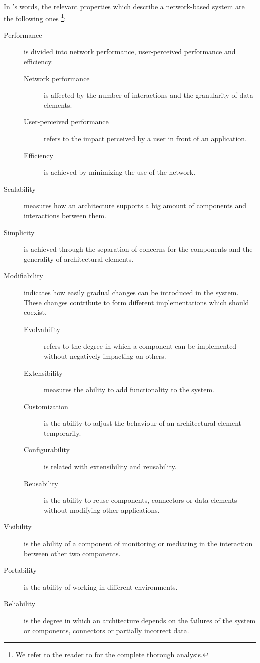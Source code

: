 In \citeauthor{fielding_architectural_2000}'s words, the relevant properties which describe a network-based system are the following ones \footnote{We refer to the reader to \citet{fielding_architectural_2000} for the complete thorough analysis.}:
\begin{description}
  \item[Performance] is divided into network performance, user-perceived performance and efficiency.
    \begin{description}
      \item[Network performance] is affected by the number of interactions and the granularity of data elements.
      \item[User-perceived performance] refers to the impact perceived by a user in front of an application. %
      \item[Efficiency] is achieved by minimizing the use of the network.
    \end{description}
  \item[Scalability] measures how an architecture supports a big amount of components and interactions between them.
  \item[Simplicity] is achieved through the separation of concerns for the components and the generality of architectural elements.
  \item[Modifiability] indicates how easily gradual changes can be introduced in the system.
                       These changes contribute to form different implementations which should coexist.
    \begin{description}
      \item[Evolvability] refers to the degree in which a component can be implemented without negatively impacting on others.
      \item[Extensibility] measures the ability to add functionality to the system.
      \item[Customization] is the ability to adjust the behaviour of an architectural element temporarily.
      \item[Configurability] is related with extensibility and reusability.
      \item[Reusability] is the ability to reuse components, connectors or data elements without modifying other applications.
    \end{description}
  \item[Visibility] is the ability of a component of monitoring or mediating in the interaction between other two components.
  \item[Portability] is the ability of working in different environments.
  \item[Reliability] is the degree in which an architecture depends on the failures of the system or components, connectors or partially incorrect data.
\end{description}


